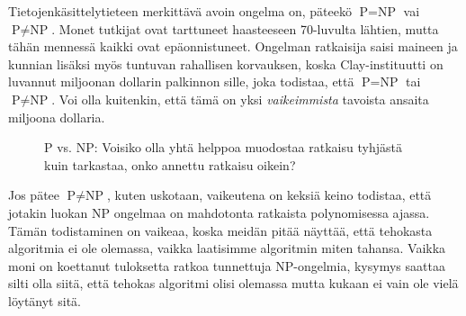 Tietojenkäsittelytieteen merkittävä avoin ongelma on,
päteekö $\textrm{P}=\textrm{NP}$ vai $\textrm{P} \neq \textrm{NP}$.
Monet tutkijat ovat tarttuneet haasteeseen
70-luvulta lähtien, mutta tähän mennessä kaikki ovat epäonnistuneet.
Ongelman ratkaisija saisi maineen ja kunnian lisäksi
myös tuntuvan rahallisen korvauksen, koska
Clay-instituutti on luvannut miljoonan dollarin palkinnon
sille, joka todistaa, että $\textrm{P}=\textrm{NP}$ tai $\textrm{P} \neq \textrm{NP}$.
Voi olla kuitenkin, että tämä on yksi \emph{vaikeimmista}
tavoista ansaita miljoona dollaria.

\begin{figure}
\center
\begin{center}
\end{center}
\caption{P vs. NP: Voisiko olla yhtä helppoa muodostaa ratkaisu tyhjästä
kuin tarkastaa, onko annettu ratkaisu oikein?}
\label{fig:pvsnpp}
\end{figure}

Jos pätee $\textrm{P} \neq \textrm{NP}$, kuten uskotaan,
vaikeutena on keksiä keino todistaa, että jotakin
luokan NP ongelmaa on mahdotonta ratkaista
polynomisessa ajassa.
Tämän todistaminen on vaikeaa, koska meidän pitää näyttää,
että tehokasta algoritmia ei ole olemassa,
vaikka laatisimme algoritmin miten tahansa.
Vaikka moni on koettanut tuloksetta ratkoa
tunnettuja NP-ongelmia, kysymys saattaa silti olla siitä,
että tehokas algoritmi olisi olemassa mutta kukaan ei
vain ole vielä löytänyt sitä.

